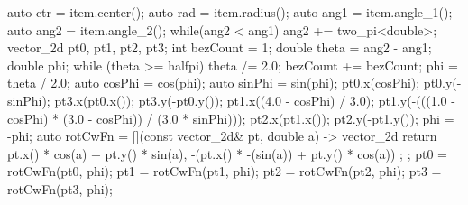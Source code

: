 \begin{codeblock}
{{{        auto ctr = item.center();
        auto rad = item.radius();
        auto ang1 = item.angle_1();
        auto ang2 = item.angle_2();
        while(ang2 < ang1) {
          ang2 += two_pi<double>;
        }
        vector_2d pt0, pt1, pt2, pt3;
        int bezCount = 1;
        double theta = ang2 - ang1;
        double phi;
        while (theta >= halfpi) {
          theta /= 2.0;
          bezCount += bezCount;
        }
        phi = theta / 2.0;
        auto cosPhi = cos(phi);
        auto sinPhi = sin(phi);
        pt0.x(cosPhi);
        pt0.y(-sinPhi);
        pt3.x(pt0.x());
        pt3.y(-pt0.y());
        pt1.x((4.0 - cosPhi) / 3.0);
        pt1.y(-(((1.0 - cosPhi) * (3.0 - cosPhi)) / (3.0 * sinPhi)));
        pt2.x(pt1.x());
        pt2.y(-pt1.y());
        phi = -phi;
        auto rotCwFn = [](const vector_2d& pt, double a) -> vector_2d {
          return { pt.x() * cos(a) + pt.y() * sin(a),
            -(pt.x() * -(sin(a)) + pt.y() * cos(a)) };
        };
        pt0 = rotCwFn(pt0, phi);
        pt1 = rotCwFn(pt1, phi);
        pt2 = rotCwFn(pt2, phi);
        pt3 = rotCwFn(pt3, phi);
        
}}}
\end{codeblock}

